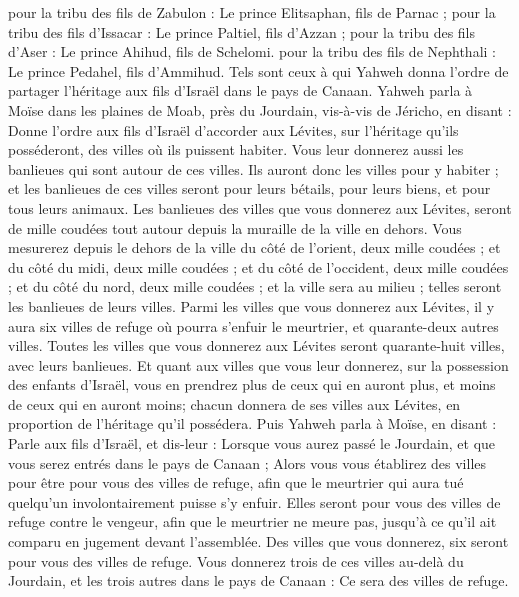 \begin{multicols}{2}
pour la tribu des fils de Zabulon : Le prince Elitsaphan, fils de Parnac ;
pour la tribu des fils d'Issacar : Le prince Paltiel, fils d’Azzan ;
pour la tribu des fils d'Aser : Le prince Ahihud, fils de Schelomi.
pour la tribu des fils de Nephthali : Le prince Pedahel, fils d’Ammihud.
Tels sont ceux à qui Yahweh donna l’ordre de partager l'héritage aux fils d'Israël dans le pays de Canaan.
\VerseOne{}Yahweh parla à Moïse dans les plaines de Moab, près du Jourdain, vis-à-vis de Jéricho, en disant :
Donne l’ordre aux fils d'Israël d’accorder aux Lévites, sur l’héritage qu’ils posséderont, des villes où ils puissent habiter. Vous leur donnerez aussi les banlieues qui sont autour de ces villes.
Ils auront donc les villes pour y habiter ; et les banlieues de ces villes seront pour leurs bétails, pour leurs biens, et pour tous leurs animaux.
Les banlieues des villes que vous donnerez aux Lévites, seront de mille coudées tout autour depuis la muraille de la ville en dehors.
Vous mesurerez depuis le dehors de la ville du côté de l'orient, deux mille coudées ; et du côté du midi, deux mille coudées ; et du côté de l'occident, deux mille coudées ; et du côté du nord, deux mille coudées ; et la ville sera au milieu ; telles seront les banlieues de leurs villes.
Parmi les villes que vous donnerez aux Lévites, il y aura six villes de refuge où pourra s’enfuir le meurtrier, et quarante-deux autres villes.
Toutes les villes que vous donnerez aux Lévites seront quarante-huit villes, avec leurs banlieues.
Et quant aux villes que vous leur donnerez, sur la possession des enfants d'Israël, vous en prendrez plus de ceux qui en auront plus, et moins de ceux qui en auront moins; chacun donnera de ses villes aux Lévites, en proportion de l'héritage qu'il possédera.
Puis Yahweh parla à Moïse, en disant :
Parle aux fils d'Israël, et dis-leur : Lorsque vous aurez passé le Jourdain, et que vous serez entrés dans le pays de Canaan ;
Alors vous vous établirez des villes pour être pour vous des villes de refuge, afin que le meurtrier qui aura tué quelqu’un involontairement puisse s’y enfuir.
Elles seront pour vous des villes de refuge contre le vengeur, afin que le meurtrier ne meure pas, jusqu’à ce qu’il ait comparu en jugement devant l’assemblée.
Des villes que vous donnerez, six seront pour vous des villes de refuge.
Vous donnerez trois de ces villes au-delà du Jourdain, et les trois autres dans le pays de Canaan : Ce sera des villes de refuge.

\end{multicols}
